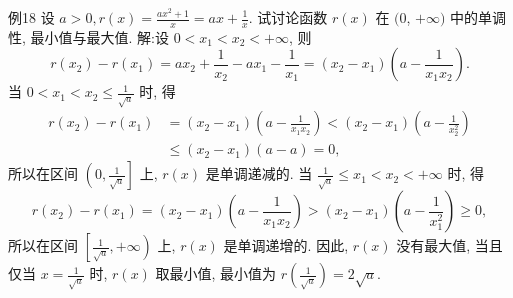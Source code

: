例18 设 $a>0, r(x)=\frac{a x^2+1}{x}=a x+\frac{1}{x}$. 试讨论函数 $r(x)$ 在 $(0$, $+\infty)$ 中的单调性, 最小值与最大值.
解:设 $0<x_1<x_2<+\infty$, 则
$$
r\left(x_2\right)-r\left(x_1\right)=a x_2+\frac{1}{x_2}-a x_1-\frac{1}{x_1}=\left(x_2-x_1\right)\left(a-\frac{1}{x_1 x_2}\right) .
$$
当 $0<x_1<x_2 \leqslant \frac{1}{\sqrt{a}}$ 时, 得
$$
\begin{aligned}
r\left(x_2\right)-r\left(x_1\right) & =\left(x_2-x_1\right)\left(a-\frac{1}{x_1 x_2}\right)<\left(x_2-x_1\right)\left(a-\frac{1}{x_2^2}\right) \\
& \leqslant\left(x_2-x_1\right)(a-a)=0,
\end{aligned}
$$
所以在区间 $\left(0, \frac{1}{\sqrt{a}}\right]$ 上, $r(x)$ 是单调递减的.
当 $\frac{1}{\sqrt{a}} \leqslant x_1<x_2<+\infty$ 时, 得
$$
r\left(x_2\right)-r\left(x_1\right)=\left(x_2-x_1\right)\left(a-\frac{1}{x_1 x_2}\right)>\left(x_2-x_1\right)\left(a-\frac{1}{x_1^2}\right) \geqslant 0,
$$
所以在区间 $\left[\frac{1}{\sqrt{a}},+\infty\right)$ 上, $r(x)$ 是单调递增的.
因此, $r(x)$ 没有最大值, 当且仅当 $x=\frac{1}{\sqrt{a}}$ 时, $r(x)$ 取最小值, 最小值为 $r\left(\frac{1}{\sqrt{a}}\right)=2 \sqrt{a}$.




